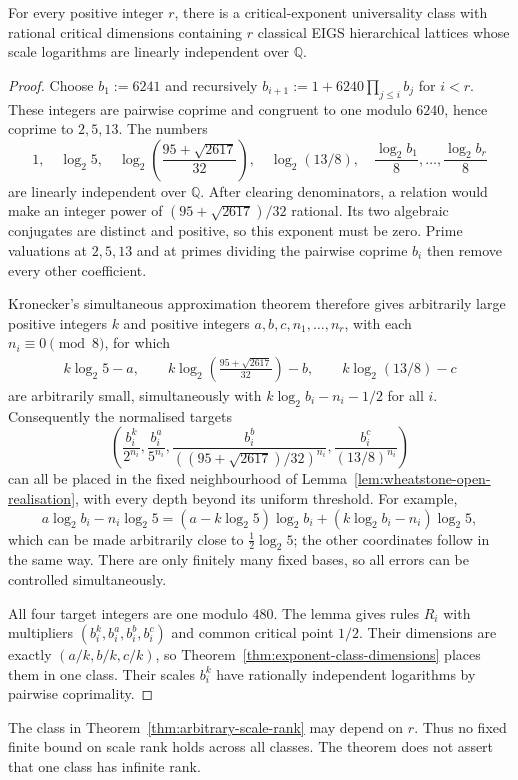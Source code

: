 \begin{theorem}\label{thm:arbitrary-scale-rank}
For every positive integer $r$, there is a critical-exponent universality class with rational critical dimensions containing $r$ classical EIGS hierarchical lattices whose scale logarithms are linearly independent over $\mathbb Q$.
\end{theorem}
\begin{proof}
Choose $b_1:=6241$ and recursively
$b_{i+1}:=1+6240\prod_{j\le i}b_j$ for $i<r$.
These integers are pairwise coprime and congruent to one modulo $6240$, hence coprime to $2,5,13$. The numbers
\[
 1,\quad \log_2 5,\quad
 \log_2\!\left(\frac{95+\sqrt{2617}}{32}\right),\quad
 \log_2(13/8),\quad
 \frac{\log_2 b_1}{8},\ldots,\frac{\log_2 b_r}{8}
\]
are linearly independent over $\mathbb Q$. After clearing denominators, a relation would make an integer power of $(95+\sqrt{2617})/32$ rational. Its two algebraic conjugates are distinct and positive, so this exponent must be zero. Prime valuations at $2,5,13$ and at primes dividing the pairwise coprime $b_i$ then remove every other coefficient.

Kronecker's simultaneous approximation theorem therefore gives arbitrarily large positive integers $k$ and positive integers $a,b,c,n_1,\ldots,n_r$, with each $n_i\equiv0\pmod8$, for which
\begin{gather*}
 k\log_2 5-a,\qquad
 k\log_2\!\left(\frac{95+\sqrt{2617}}{32}\right)-b,\qquad
 k\log_2(13/8)-c
\end{gather*}
are arbitrarily small, simultaneously with
$k\log_2 b_i-n_i-1/2$ for all $i$.
Consequently the normalised targets
\[
 \left(\frac{b_i^k}{2^{n_i}},\frac{b_i^a}{5^{n_i}},
 \frac{b_i^b}{((95+\sqrt{2617})/32)^{n_i}},
 \frac{b_i^c}{(13/8)^{n_i}}\right)
\]
can all be placed in the fixed neighbourhood of Lemma~\ref{lem:wheatstone-open-realisation}, with every depth beyond its uniform threshold. For example,
\[
 a\log_2 b_i-n_i\log_2 5
 =(a-k\log_2 5)\log_2 b_i
 +(k\log_2 b_i-n_i)\log_2 5,
\]
which can be made arbitrarily close to $\tfrac12\log_2 5$; the other coordinates follow in the same way. There are only finitely many fixed bases, so all errors can be controlled simultaneously.

All four target integers are one modulo $480$. The lemma gives rules $R_i$ with multipliers $(b_i^k,b_i^a,b_i^b,b_i^c)$ and common critical point $1/2$. Their dimensions are exactly $(a/k,b/k,c/k)$, so Theorem~\ref{thm:exponent-class-dimensions} places them in one class. Their scales $b_i^k$ have rationally independent logarithms by pairwise coprimality.
\end{proof}

The class in Theorem~\ref{thm:arbitrary-scale-rank} may depend on $r$. Thus no fixed finite bound on scale rank holds across all classes. The theorem does not assert that one class has infinite rank.

